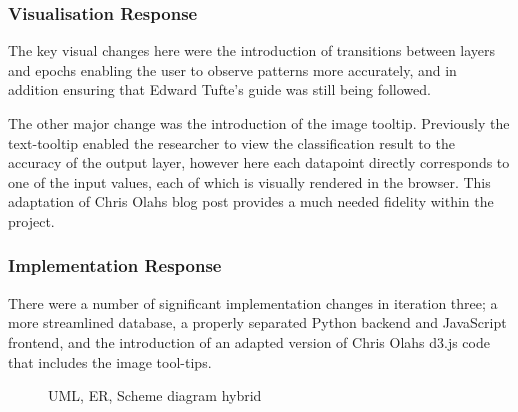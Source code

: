 \documentclass[a4paper,11pt,titlepage]{article}
\begin{document}
		\subsubsection{Visualisation Response}
		The key visual changes here were the introduction of transitions between layers and epochs enabling the user to observe patterns more accurately, and in addition ensuring that Edward Tufte's guide was still being followed.
		\par 
		The other major change was the introduction of the image tooltip. Previously the text-tooltip enabled the researcher to view the classification result to the accuracy of the output layer, however here each datapoint directly corresponds to one of the input values, each of which is visually rendered in the browser. This adaptation of Chris Olahs blog post provides a much needed fidelity within the project.		
	\subsubsection{Implementation Response}
	There were a number of significant implementation changes in iteration three; a more streamlined database, a properly separated Python backend and JavaScript frontend, and the introduction of an adapted version of Chris Olahs \cite{Olah2014c} d3.js code that includes the image tool-tips.
		
	\begin{figure}[H]
    			\caption{UML, ER, Scheme diagram hybrid}%
	\end{figure}	
	
\end{document}
